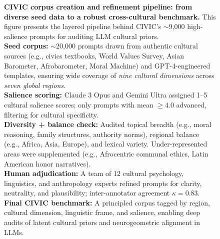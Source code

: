 \begin{figure}[htbp]
\begin{tikzpicture}[
  node distance=1.4cm,
  box/.style={
    rectangle, rounded corners, draw=black, very thick,
    align=center, font=\small, text width=0.6\textwidth, inner sep=6pt
  },
  arrow/.style={->, thick}
]
\end{tikzpicture}
\vspace{1em}
\caption{
\textbf{CIVIC corpus creation and refinement pipeline: from diverse seed data to a robust cross-cultural benchmark.}
This figure presents the layered pipeline behind CIVIC's $\sim$9{,}000 high-salience prompts for auditing LLM cultural priors.\\
\textbf{Seed corpus:} $\sim$20{,}000 prompts drawn from authentic cultural sources (e.g., civics textbooks, World Values Survey, Asian Barometer, Afrobarometer, Moral Machine) and GPT-4-engineered templates, ensuring wide coverage of \emph{nine cultural dimensions} across \emph{seven global regions}. \\
\textbf{Salience scoring:} Claude 3 Opus and Gemini Ultra assigned 1--5 cultural salience scores; only prompts with mean $\geq 4.0$ advanced, filtering for cultural specificity. \\
\textbf{Diversity + balance check:} Audited topical breadth (e.g., moral reasoning, family structures, authority norms), regional balance (e.g., Africa, Asia, Europe), and lexical variety. Under-represented areas were supplemented (e.g., Afrocentric communal ethics, Latin American honor narratives).\\
\textbf{Human adjudication:} A team of 12 cultural psychology, linguistics, and anthropology experts refined prompts for clarity, neutrality, and plausibility; inter-annotator agreement $\kappa=0.83$.\\
\textbf{Final CIVIC benchmark:} A principled corpus tagged by region, cultural dimension, linguistic frame, and salience, enabling deep audits of latent cultural priors and neurogeometric alignment in LLMs.
}
\label{fig:civic_pipeline}
\end{figure}











\clearpage



